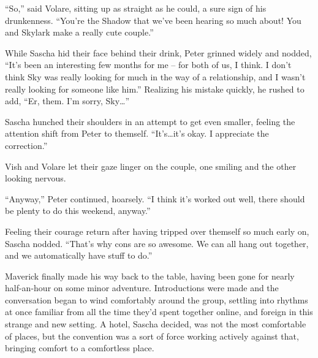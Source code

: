 ``So,'' said Volare, sitting up as straight as he could, a sure sign of his drunkenness. ``You're the Shadow that we've been hearing so much about! You and Skylark make a really cute couple.''

While Sascha hid their face behind their drink, Peter grinned widely and nodded, ``It's been an interesting few months for me -- for both of us, I think. I don't think Sky was really looking for much in the way of a relationship, and I wasn't really looking for someone like him.'' Realizing his mistake quickly, he rushed to add, ``Er, them. I'm sorry, Sky\ldots{}''

Sascha hunched their shoulders in an attempt to get even smaller, feeling the attention shift from Peter to themself. ``It's\ldots{}it's okay. I appreciate the correction.''

Vish and Volare let their gaze linger on the couple, one smiling and the other looking nervous.

``Anyway,'' Peter continued, hoarsely. ``I think it's worked out well, there should be plenty to do this weekend, anyway.''

Feeling their courage return after having tripped over themself so much early on, Sascha nodded. ``That's why cons are so awesome. We can all hang out together, and we automatically have stuff to do.''

Maverick finally made his way back to the table, having been gone for nearly half-an-hour on some minor adventure. Introductions were made and the conversation began to wind comfortably around the group, settling into rhythms at once familiar from all the time they'd spent together online, and foreign in this strange and new setting. A hotel, Sascha decided, was not the most comfortable of places, but the convention was a sort of force working actively against that, bringing comfort to a comfortless place.
